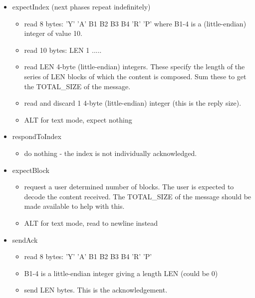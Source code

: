 \documentclass[a4]{article}
\begin{document}
\begin{itemize}
\item expectIndex (next phases repeat indefinitely)
  \begin{itemize}
  \item read 8 bytes: 'Y' 'A' B1 B2 B3 B4 'R' 'P' where B1-4 is a 
    (little-endian) integer of value 10.
  \item read 10 bytes: LEN 1 .....
  \item read LEN 4-byte (little-endian) integers.  These specify
    the length of the series of LEN blocks of which the
    content is composed.  Sum these to get the TOTAL\_SIZE of the 
    message.
  \item read and discard 1 4-byte (little-endian) integer (this is
    the reply size).
  \item ALT for text mode, expect nothing
  \end{itemize}

\item respondToIndex
  \begin{itemize}
  \item do nothing - the index is not individually acknowledged.
  \end{itemize}

\item expectBlock
  \begin{itemize}
  \item request a user determined number of blocks.  The user
    is expected to decode the content received.  The TOTAL\_SIZE
    of the message should be made available to help with this.
  \item ALT for text mode, read to newline instead
  \end{itemize}

\item sendAck
  \begin{itemize}
  \item read 8 bytes: 'Y' 'A' B1 B2 B3 B4 'R' 'P'
  \item B1-4 is a little-endian integer giving a length LEN (could be 0)
  \item send LEN bytes.  This is the acknowledgement.
  \end{itemize}
\end{itemize}



\end{document}
